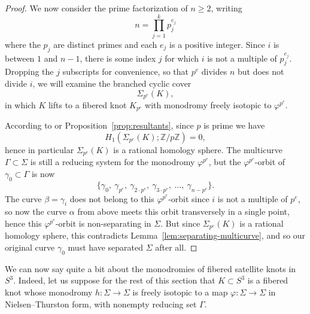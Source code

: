 \documentclass[11pt]{amsart}
\numberwithin{equation}{section}
\numberwithin{theorem}{section}
\theoremstyle{definition}
\newcommand{\Z}{\mathbb{Z}}
\renewcommand{\phi}{\varphi}
\begin{document}
\begin{proof}
We now consider the prime factorization of $n \geq 2$, writing
\[ n = \prod_{j=1}^k p_j^{e_j} \]
where the $p_j$ are distinct primes and each $e_j$ is a positive integer.  Since $i$ is between $1$ and $n-1$, there is some index $j$ for which $i$ is not a multiple of $p_j^{e_j}$.  Dropping the $j$ subscripts for convenience, so that $p^e$ divides $n$ but does not divide $i$, we will examine the branched cyclic cover
\[ \Sigma_{p^e}(K), \]
in which $K$ lifts to a fibered knot $K_{p^e}$ with monodromy freely isotopic to $\phi^{p^e}$.

According to \cite[\S5]{gordon-aspects} or Proposition~\ref{prop:resultants}, since $p$ is prime we have
\[ H_1(\Sigma_{p^e}(K); \Z/p\Z) = 0, \]
hence in particular $\Sigma_{p^e}(K)$ is a rational homology sphere.  The multicurve $\Gamma \subset \Sigma$ is still a reducing system for the monodromy $\phi^{p^e}$, but the $\phi^{p^e}$-orbit of $\gamma_0 \subset \Gamma$ is now
\[ \{ \gamma_0,\ \gamma_{p^e},\ \gamma_{2\cdot p^e},\ \gamma_{3\cdot p^e},\ \dots,\ \gamma_{n-p^e} \}. \]
The curve $\beta = \gamma_i$ does not belong to this $\phi^{p^e}$-orbit since $i$ is not a multiple of $p^e$, so now the curve $\alpha$ from above meets this orbit transversely in a single point, hence this $\phi^{p^e}$-orbit is non-separating in $\Sigma$.  But since $\Sigma_{p^e}(K)$ is a rational homology sphere, this contradicts Lemma~\ref{lem:separating-multicurve}, and so our original curve $\gamma_0$ must have separated $\Sigma$ after all.
\end{proof}

We can now say quite a bit about the monodromies of fibered satellite knots in $S^3$.  Indeed, let us suppose for the rest of this section that $K\subset S^3$ is a fibered knot whose monodromy $h:\Sigma\to \Sigma$ is freely isotopic to a map $\phi:\Sigma\to\Sigma$ in Nielsen--Thurston form, with nonempty reducing set $\Gamma$. 
\end{document}
